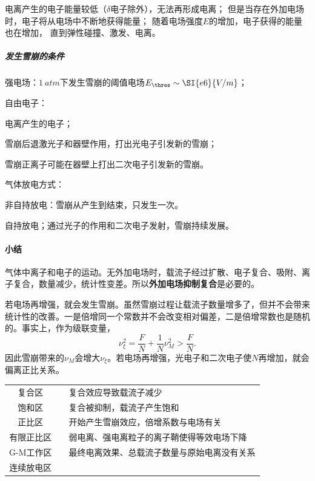 电离产生的电子能量较低（$\delta$电子除外），无法再形成电离；
但是当存在外加电场时，电子将从电场中不断地获得能量；
随着电场强度$E$的增加，电子获得的能量也在增加，%
直到弹性碰撞、激发、电离。
\subparagraph{发生雪崩的条件}
\begin{compactenum}
	\item 强电场：$\SI{1}{atm}$下发生雪崩的阈值电场$E_\thres\sim\SI{e6}{V/m}$；
	\item 自由电子：
	\begin{compactenum}
		\item 电离产生的电子；
		\item 雪崩后退激光子和器壁作用，打出光电子引发新的雪崩；
		\item 雪崩正离子可能在器壁上打出二次电子引发新的雪崩。
	\end{compactenum}
\end{compactenum}
气体放电方式：
\begin{compactitem}
	\item 非自持放电：雪崩从产生到结束，只发生一次。
	\item 自持放电；通过光子的作用和二次电子发射，雪崩持续发展。
\end{compactitem}
\paragraph{小结}气体中离子和电子的运动。无外加电场时，载流子经过扩散、电子复合、吸附、离子复合，数量减少，统计性变差。所以\textbf{外加电场抑制复合}是必要的。

若电场再增强，就会发生雪崩。虽然雪崩过程让载流子数量增多了，但并不会带来统计性的改善。一是倍增同一个常数并不会改变相对偏差，二是倍增常数也是随机的。事实上，作为级联变量，
\[
	\nu_\xi^2=\frac FN+\frac1N\nu_M^2>\frac FN.
\]
因此雪崩带来的$\nu_M$会增大$\nu_\xi$。若电场再增强，光电子和二次电子使$N$再增加，就会偏离正比关系。

\begin{center}
	\begin{tabular}{ccl}
		\toprule
		复合区&&复合效应导致载流子减少\\
		饱和区&\checkmark&复合被抑制，载流子产生饱和\\
		正比区&\checkmark&开始产生雪崩效应，倍增系数与电场有关\\
		有限正比区&&弱电离、强电离粒子的离子鞘使得等效电场下降\\
		G-M工作区&\checkmark&最终电离效果、总载流子数量与原始电离没有关系\\
		连续放电区\\
		\bottomrule
	\end{tabular}
\end{center}


